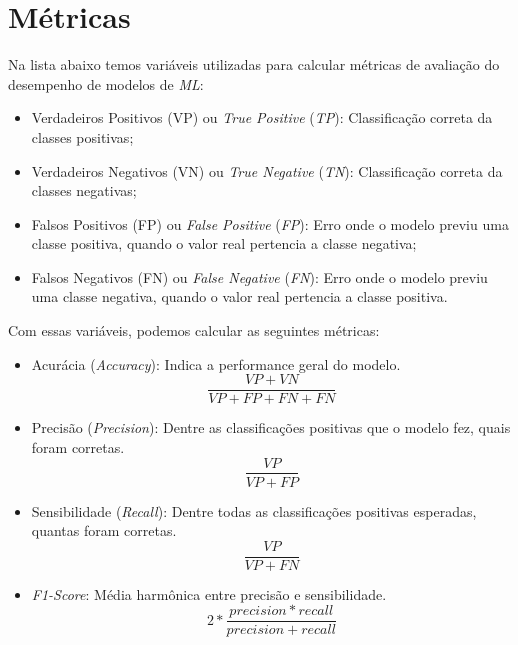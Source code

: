 \section{Métricas}\label{sec:metricas}

Na lista abaixo temos variáveis utilizadas para calcular métricas de avaliação do desempenho de modelos de \textit{ML}:

\begin{itemize}
    \item Verdadeiros Positivos (VP) ou \textit{True Positive} (\textit{TP}): Classificação correta da classes positivas;
    \item Verdadeiros Negativos (VN) ou \textit{True Negative} (\textit{TN}): Classificação correta da classes negativas;
    \item Falsos Positivos (FP) ou \textit{False Positive} (\textit{FP}): Erro onde o modelo previu uma classe positiva, quando o valor real pertencia a classe negativa;
    \item Falsos Negativos (FN) ou \textit{False Negative} (\textit{FN}): Erro onde o modelo previu uma classe negativa, quando o valor real pertencia a classe positiva.
\end{itemize}

Com essas variáveis, podemos calcular as seguintes métricas:

\begin{itemize}
    \item Acurácia (\textit{Accuracy}): Indica a performance geral do modelo.
        \begin{equation}
        \frac{VP + VN}{VP+FP+FN+FN}
        \end{equation}
    \item Precisão (\textit{Precision}): Dentre as classificações positivas que o modelo fez, quais foram corretas.
        \begin{equation}
        \frac{VP}{VP+FP}
        \end{equation}
    \item Sensibilidade (\textit{Recall}): Dentre todas as classificações positivas esperadas, quantas foram corretas.
        \begin{equation}
        \frac{VP}{VP+FN}
        \end{equation}
    \item \textit{F1-Score}: Média harmônica entre precisão e sensibilidade.
        \begin{equation}
        2 * \frac{precision  * recall}{precision + recall}
        \end{equation}
\end{itemize}
